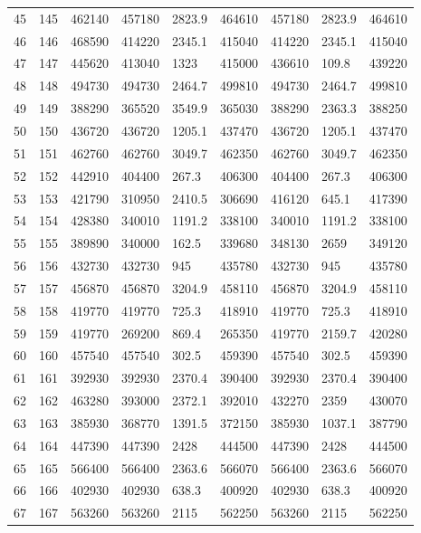 \begin{tabular}{lllllllll}
45 & 145 & 462140 & 457180 & 2823.9 & 464610 & 457180 & 2823.9 & 464610 \\ 
46 & 146 & 468590 & 414220 & 2345.1 & 415040 & 414220 & 2345.1 & 415040 \\ 
47 & 147 & 445620 & 413040 & 1323 & 415000 & 436610 & 109.8 & 439220 \\ 
48 & 148 & 494730 & 494730 & 2464.7 & 499810 & 494730 & 2464.7 & 499810 \\ 
49 & 149 & 388290 & 365520 & 3549.9 & 365030 & 388290 & 2363.3 & 388250 \\ 
50 & 150 & 436720 & 436720 & 1205.1 & 437470 & 436720 & 1205.1 & 437470 \\ 
51 & 151 & 462760 & 462760 & 3049.7 & 462350 & 462760 & 3049.7 & 462350 \\ 
52 & 152 & 442910 & 404400 & 267.3 & 406300 & 404400 & 267.3 & 406300 \\ 
53 & 153 & 421790 & 310950 & 2410.5 & 306690 & 416120 & 645.1 & 417390 \\ 
54 & 154 & 428380 & 340010 & 1191.2 & 338100 & 340010 & 1191.2 & 338100 \\ 
55 & 155 & 389890 & 340000 & 162.5 & 339680 & 348130 & 2659 & 349120 \\ 
56 & 156 & 432730 & 432730 & 945 & 435780 & 432730 & 945 & 435780 \\ 
57 & 157 & 456870 & 456870 & 3204.9 & 458110 & 456870 & 3204.9 & 458110 \\ 
58 & 158 & 419770 & 419770 & 725.3 & 418910 & 419770 & 725.3 & 418910 \\ 
59 & 159 & 419770 & 269200 & 869.4 & 265350 & 419770 & 2159.7 & 420280 \\ 
60 & 160 & 457540 & 457540 & 302.5 & 459390 & 457540 & 302.5 & 459390 \\ 
61 & 161 & 392930 & 392930 & 2370.4 & 390400 & 392930 & 2370.4 & 390400 \\ 
62 & 162 & 463280 & 393000 & 2372.1 & 392010 & 432270 & 2359 & 430070 \\ 
63 & 163 & 385930 & 368770 & 1391.5 & 372150 & 385930 & 1037.1 & 387790 \\ 
64 & 164 & 447390 & 447390 & 2428 & 444500 & 447390 & 2428 & 444500 \\ 
65 & 165 & 566400 & 566400 & 2363.6 & 566070 & 566400 & 2363.6 & 566070 \\ 
66 & 166 & 402930 & 402930 & 638.3 & 400920 & 402930 & 638.3 & 400920 \\ 
67 & 167 & 563260 & 563260 & 2115 & 562250 & 563260 & 2115 & 562250 \\ 

\end{tabular}
